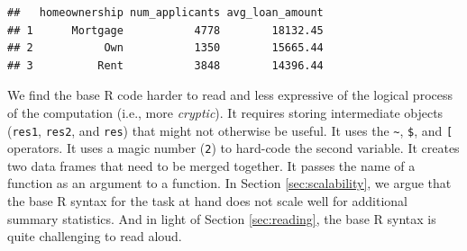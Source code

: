 \documentclass[12pt]{article}
\newenvironment{Shaded}{\begin{snugshade}}{\end{snugshade}}
\newcommand{\AttributeTok}[1]{\textcolor[rgb]{0.77,0.63,0.00}{#1}}
\newcommand{\ConstantTok}[1]{\textcolor[rgb]{0.00,0.00,0.00}{#1}}
\newcommand{\DecValTok}[1]{\textcolor[rgb]{0.00,0.00,0.81}{#1}}
\newcommand{\FunctionTok}[1]{\textcolor[rgb]{0.00,0.00,0.00}{#1}}
\newcommand{\NormalTok}[1]{#1}
\newcommand{\OtherTok}[1]{\textcolor[rgb]{0.56,0.35,0.01}{#1}}
\newcommand{\SpecialCharTok}[1]{\textcolor[rgb]{0.00,0.00,0.00}{#1}}
\newcommand{\StringTok}[1]{\textcolor[rgb]{0.31,0.60,0.02}{#1}}
\begin{document}
\begin{Shaded}
\end{Shaded}

\begin{verbatim}
##   homeownership num_applicants avg_loan_amount
## 1      Mortgage           4778        18132.45
## 2           Own           1350        15665.44
## 3          Rent           3848        14396.44
\end{verbatim}


\label{base-summary} \linespread{2}
\vspace{3mm}\setlength{\parindent}{15pt}

We find the base R code harder to read and less expressive of the
logical process of the computation (i.e., more \emph{cryptic}). It
requires storing intermediate objects (\texttt{res1}, \texttt{res2}, and
\texttt{res}) that might not otherwise be useful. It uses the
\texttt{\textasciitilde{}}, \texttt{\$}, and \texttt{{[}} operators. It
uses a magic number (\texttt{2}) to hard-code the second variable. It
creates two data frames that need to be merged together. It passes the
name of a function as an argument to a function. In Section
\ref{sec:scalability}, we argue that the base R syntax for the task at
hand does not scale well for additional summary statistics. And in light
of Section \ref{sec:reading}, the base R syntax is quite challenging to
read aloud.
\end{document}
